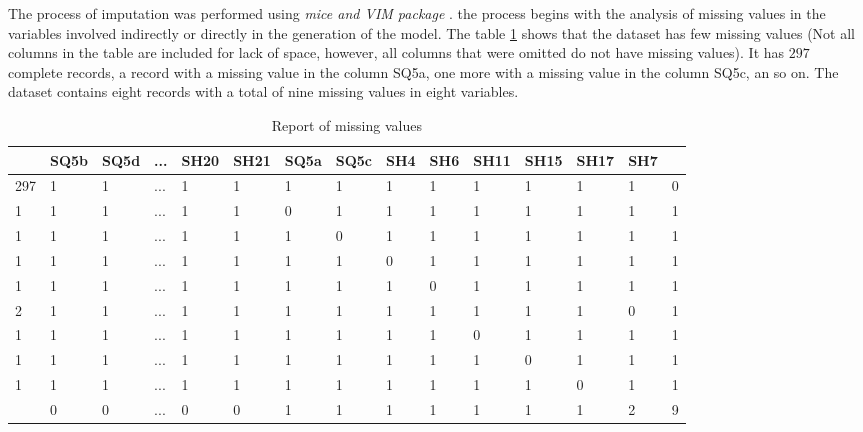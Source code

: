 \documentclass[]{book}
\begin{document}
The process of imputation was performed using \emph{mice and VIM
package} \citep[\citet{VIM2016}]{mice2011}. the process begins with the
analysis of missing values in the variables involved indirectly or
directly in the generation of the model. The table
\ref{tab-report-of-missing-value-in-SHSQ} shows that the dataset has few
missing values (Not all columns in the table are included for lack of
space, however, all columns that were omitted do not have missing
values). It has \(297\) complete records, a record with a missing value
in the column SQ5a, one more with a missing value in the column SQ5c, an
so on. The dataset contains eight records with a total of nine missing
values in eight variables.

\begin{table}[ht]
\centering
\caption{Report of missing values}
\label{tab-report-of-missing-value-in-SHSQ}
\begin{tabular}{|l|l|l|l|l|l|l|l|l|l|l|l|l|l|l|}
\hline
    & SQ5b & SQ5d & ... & SH20 & SH21 & SQ5a & SQ5c & SH4 & SH6 & SH11 & SH15 & SH17 & SH7 &   \\ \hline
297 & 1    & 1    & ... & 1    & 1    & 1    & 1    & 1   & 1   & 1    & 1    & 1    & 1   & 0 \\ \hline
1   & 1    & 1    & ... & 1    & 1    & 0    & 1    & 1   & 1   & 1    & 1    & 1    & 1   & 1 \\ \hline
1   & 1    & 1    & ... & 1    & 1    & 1    & 0    & 1   & 1   & 1    & 1    & 1    & 1   & 1 \\ \hline
1   & 1    & 1    & ... & 1    & 1    & 1    & 1    & 0   & 1   & 1    & 1    & 1    & 1   & 1 \\ \hline
1   & 1    & 1    & ... & 1    & 1    & 1    & 1    & 1   & 0   & 1    & 1    & 1    & 1   & 1 \\ \hline
2   & 1    & 1    & ... & 1    & 1    & 1    & 1    & 1   & 1   & 1    & 1    & 1    & 0   & 1 \\ \hline
1   & 1    & 1    & ... & 1    & 1    & 1    & 1    & 1   & 1   & 0    & 1    & 1    & 1   & 1 \\ \hline
1   & 1    & 1    & ... & 1    & 1    & 1    & 1    & 1   & 1   & 1    & 0    & 1    & 1   & 1 \\ \hline
1   & 1    & 1    & ... & 1    & 1    & 1    & 1    & 1   & 1   & 1    & 1    & 0    & 1   & 1 \\ \hline
    & 0    & 0    & ... & 0    & 0    & 1    & 1    & 1   & 1   & 1    & 1    & 1    & 2   & 9 \\ \hline
\end{tabular}
\end{table}
\end{document}
